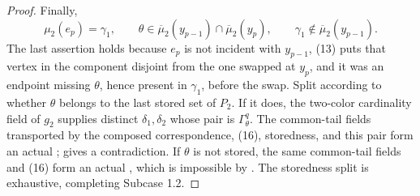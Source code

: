 \begin{proof}
Finally,
\[
 \mu_2(e_p)=\gamma_1,\qquad
 \theta\in\overline\mu_2(y_{p-1})\cap
             \overline\mu_2(y_p),\qquad
 \gamma_1\notin\overline\mu_2(y_{p-1}).                      \tag{16}
\]
The last assertion holds because \(e_p\) is not incident with
\(y_{p-1}\), (13) puts that vertex in the component disjoint from the
one swapped at \(y_p\), and it was an endpoint missing \(\theta\), hence
present in \(\gamma_1\), before the swap.  Split according to whether
\(\theta\) belongs to the last stored set of \(P_2\).  If it does, the
two-color cardinality field of \(g_2\) supplies distinct
\(\delta_1,\delta_2\) whose pair is
\(\Gamma^q_\theta\).  The common-tail fields transported by the composed
correspondence, (16), storedness, and this pair form an actual
;
 gives a contradiction.  If
\(\theta\) is not stored, the same common-tail fields and (16) form an
actual , which is impossible by
.  The storedness split is
exhaustive, completing Subcase 1.2.
\end{proof}

